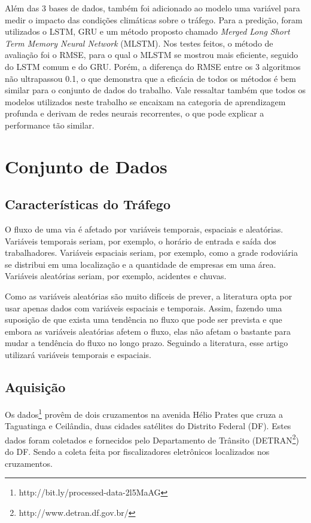 \documentclass[conference]{IEEEtran}
\begin{document}
Além das 3 bases de dados, também foi adicionado ao modelo uma variável para medir o impacto das condições climáticas sobre o tráfego.
Para a predição, foram utilizados o LSTM, GRU e um método proposto chamado \textit{Merged Long Short Term Memory Neural Network} (MLSTM). Nos testes feitos, o método de avaliação foi o RMSE, para o qual o MLSTM se mostrou mais eficiente, seguido do LSTM comum e do GRU. Porém, a diferença do RMSE entre os 3 algoritmos não ultrapassou 0.1, o que demonstra que a eficácia de todos os métodos é bem similar para o conjunto de dados do trabalho. Vale ressaltar também que todos os modelos utilizados neste trabalho se encaixam na categoria de aprendizagem profunda e derivam de redes neurais recorrentes, o que pode explicar a performance tão similar.

\section{Conjunto de Dados}

\subsection{Características do Tráfego}

O fluxo de uma via é afetado por variáveis temporais, espaciais e aleatórias. Variáveis temporais seriam, por exemplo, o horário de entrada e saída dos trabalhadores. Variáveis espaciais seriam, por exemplo, como a grade rodoviária se distribui em uma localização e a quantidade de empresas em uma área. Variáveis aleatórias seriam, por exemplo, acidentes e chuvas.

Como as variáveis aleatórias são muito difíceis de prever, a literatura opta por usar apenas dados com variáveis espaciais e temporais. Assim, fazendo uma suposição de que exista uma tendência no fluxo que pode ser prevista e que embora as variáveis aleatórias afetem o fluxo, elas não afetam o bastante para mudar a tendência do fluxo no longo prazo. Seguindo a literatura, esse artigo utilizará variáveis temporais e espaciais.

\subsection{Aquisição}

Os dados\footnote{http://bit.ly/processed-data-2l5MaAG} provêm de dois cruzamentos na avenida Hélio Prates que cruza a Taguatinga e Ceilândia, duas cidades satélites do Distrito Federal (DF). Estes dados foram coletados e fornecidos pelo Departamento de Trânsito (DETRAN\footnote{http://www.detran.df.gov.br/}) do DF. Sendo a coleta feita por fiscalizadores eletrônicos localizados nos cruzamentos.
\end{document}
